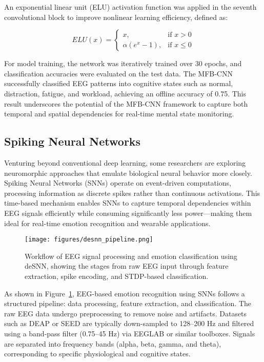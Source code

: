 \documentclass[conference]{IEEEtran}
\begin{document}
An exponential linear unit (ELU) activation function was applied in the seventh convolutional block to improve nonlinear learning efficiency, defined as:

\begin{equation}
ELU(x) =
\begin{cases}
x, & \text{if } x > 0 \\
\alpha (e^{x} - 1), & \text{if } x \leq 0
\end{cases}
\end{equation}

For model training, the network was iteratively trained over 30 epochs, and classification accuracies were evaluated on the test data. The MFB-CNN successfully classified EEG patterns into cognitive states such as normal, distraction, fatigue, and workload, achieving an offline accuracy of 0.75. This result underscores the potential of the MFB-CNN framework to capture both temporal and spatial dependencies for real-time mental state monitoring.


\subsection{Spiking Neural Networks}
Venturing beyond conventional deep learning, some researchers are exploring neuromorphic approaches that emulate biological neural behavior more closely. Spiking Neural Networks (SNNs) operate on event-driven computations, processing information as discrete spikes rather than continuous activations. This time-based mechanism enables SNNs to capture temporal dependencies within EEG signals efficiently while consuming significantly less power—making them ideal for real-time emotion recognition and wearable applications.

\begin{figure}[H]
    \centering
    \texttt{[image: figures/desnn\_pipeline.png]}
    \caption{Workflow of EEG signal processing and emotion classification using deSNN, showing the stages from raw EEG input through feature extraction, spike encoding, and STDP-based classification.}
    \label{fig:desnn_pipeline}
\end{figure}

As shown in Figure~\ref{fig:desnn_pipeline}, EEG-based emotion recognition using SNNs follows a structured pipeline: data processing, feature extraction, and classification. The raw EEG data undergo preprocessing to remove noise and artifacts. Datasets such as DEAP or SEED are typically down-sampled to 128–200 Hz and filtered using a band-pass filter (0.75–45 Hz) via EEGLAB or similar toolboxes. Signals are separated into frequency bands (alpha, beta, gamma, and theta), corresponding to specific physiological and cognitive states.
\end{document}
